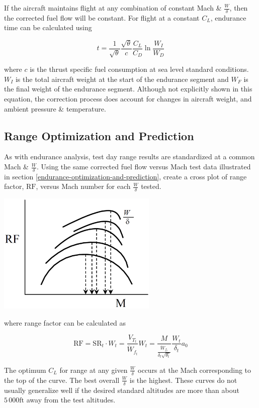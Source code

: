 \documentclass[
]{book}
\begin{document}
If the aircraft maintains flight at any combination of constant Mach \&
\(\frac{W}{\delta}\), then the corrected fuel flow will be constant. For flight
at a constant \(C_L\), endurance time can be calculated using

\[
t = \frac{1}{\sqrt{\theta}} \frac{\sqrt{\theta}}{c} \frac{C_L}{C_D} \ln \frac{W_I}{W_D}
\label{eq:endur-time-cl}
\]

where \(c\) is the thrust specific fuel consumption at sea level standard
conditions. \(W_I\) is the total aircraft weight at the start of the endurance
segment and \(W_F\) is the final weight of the endurance segment. Although not
explicitly shown in this equation, the correction process does account for
changes in aircraft weight, and ambient pressure \& temperature.

\hypertarget{range-optimization-and-prediction-1}{%
\subsection{Range Optimization and Prediction}\label{range-optimization-and-prediction-1}}

As with endurance analysis, test day range results are standardized at a common
Mach \& \(\frac{W}{\delta}\). Using the same corrected fuel flow versus Mach test
data illustrated in section \ref{endurance-optimization-and-prediction}, create
a cross plot of range factor, \(\mathrm{RF}\), versus Mach number for each
\(\frac{W}{\delta}\) tested.

\includegraphics[width=3in,height=\textheight]{media/12/rng-factor-m-curve.png}

where range factor can be calculated as

\[
\mathrm{RF} = \mathrm{SR}_t \cdot W_t = \frac{V_{T_t}}{\dot{W}_{f_t}} W_t = \frac{M}{ \frac{\dot{W}_{f_t}}{\delta_t \sqrt{\theta_t}} } \frac{W_t}{\delta_t} a_0
\label{eq:rng-factor-w-delta}
\]

The optimum \(C_L\) for range at any given \(\frac{W}{\delta}\) occurs at the
Mach corresponding to the top of the curve. The best overall \(\frac{W}{\delta}\)
is the highest. These curves do not usually generalize well if the desired
standard altitudes are more than about \(5\,000 \text{ft}\) away from the test
altitudes.
\end{document}
